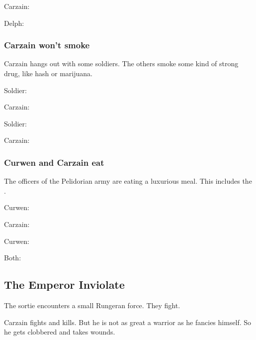 \begin{garbage}
Carzain: 

Delph: 





\subsubsection{Carzain won't smoke}
Carzain hangs out with some soldiers. The others smoke some kind of strong drug, like hash or marijuana. 

\begin{prose}
  Soldier: 
  
  Carzain: 
  
  Soldier: 
  
  Carzain: 
\end{prose}





\subsubsection{Curwen and Carzain eat}
The officers of the Pelidorian army are eating a luxurious meal. This includes the \ishrah. 

Curwen: 

Carzain: 

Curwen: 

Both: 









\subsection{The Emperor Inviolate}
The sortie encounters a small Rungeran force. They fight. 

Carzain fights and kills. 
But he is not as great a warrior as he fancies himself. 
So he gets clobbered and takes wounds. 


\end{garbage}
